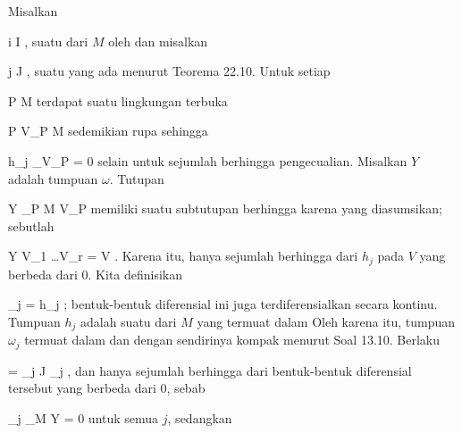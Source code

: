 {

\teilbeweis {}{}{}
{Misalkan

 {}
 {i \in I} {}
 {} {} {} {,}
suatu
dari $M$ oleh
dan misalkan

 {}
 {j \in J} {}
 {} {} {} {,}
suatu
yang ada menurut
Teorema 22.10.
Untuk setiap

\mavergleichskette
{\vergleichskette
{ P
}
{ \in }{ M
}
{  }{
}
{    }{
}
{   }{
}
}
{}{}{}
terdapat suatu lingkungan terbuka

\mavergleichskette
{\vergleichskette
{ P
}
{ \in }{ V_P
}
{ \subseteq }{ M
}
{    }{
}
{   }{
}
}
{}{}{}
sedemikian rupa sehingga

\mavergleichskette
{\vergleichskette
{ h_j \vert_{V_P }
}
{ = }{ 0
}
{  }{
}
{    }{
}
{   }{
}
}
{}{}{}
selain untuk sejumlah berhingga pengecualian. Misalkan $Y$ adalah tumpuan $\omega$. Tutupan

\mavergleichskette
{\vergleichskette
{ Y
}
{ \subseteq }{ \bigcup_{P \in M} V_P
}
{  }{
}
{    }{
}
{   }{
}
}
{}{}{}
memiliki suatu subtutupan berhingga karena
yang diasumsikan; sebutlah

\mavergleichskettedisp
{\vergleichskette
{ Y
}
{ \subseteq} { V_{1} \cup \ldots \cup V_{r}
}
{ =} { V
}
{ } {
}
{ } {
}
}
{}{}{.}
Karena itu, hanya sejumlah berhingga dari $h_j$ pada $V$ yang berbeda dari $0$. Kita definisikan

\mavergleichskette
{\vergleichskette
{ \omega_j
}
{ = }{ h_j \omega
}
{  }{
}
{    }{
}
{   }{
}
}
{}{}{;}
bentuk-bentuk diferensial ini juga terdiferensialkan secara kontinu. Tumpuan $h_j$ adalah suatu
dari $M$ yang termuat dalam
 Oleh karena itu, tumpuan $\omega_j$ termuat dalam
 dan dengan sendirinya kompak menurut
Soal 13.10.
Berlaku

\mavergleichskettedisp
{\vergleichskette
{ \omega
}
{ =} { \sum_{j \in J} \omega_j
}
{ } {
}
{ } {
}
{ } {
}
}
{}{}{,}
dan hanya sejumlah berhingga dari bentuk-bentuk diferensial
 tersebut yang berbeda dari $0$, sebab

\mavergleichskette
{\vergleichskette
{ \omega_j \vert_{M \setminus Y}
}
{ = }{ 0
}
{  }{
}
{    }{
}
{   }{
}
}
{}{}{}
untuk semua $j$, sedangkan

}}
